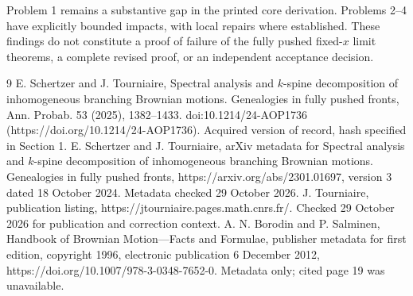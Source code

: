 \documentclass[10pt]{article}
\begin{document}
Problem 1 remains a substantive gap in the printed core derivation. Problems 2–4 have explicitly bounded impacts, with local repairs where established. These findings do not constitute a proof of failure of the fully pushed fixed-\(x\) limit theorems, a complete revised proof, or an independent acceptance decision.\par
9 E. Schertzer and J. Tourniaire, Spectral analysis and \(k\)-spine decomposition of inhomogeneous branching Brownian motions. Genealogies in fully pushed fronts, Ann. Probab. 53 (2025), 1382–1433. doi:10.1214/24-AOP1736 (https://doi.org/10.1214/24-AOP1736). Acquired version of record, hash specified in Section 1. E. Schertzer and J. Tourniaire, arXiv metadata for Spectral analysis and \(k\)-spine decomposition of inhomogeneous branching Brownian motions. Genealogies in fully pushed fronts, https://arxiv.org/abs/2301.01697, version 3 dated 18 October 2024. Metadata checked 29 October 2026. J. Tourniaire, publication listing, https://jtourniaire.pages.math.cnrs.fr/. Checked 29 October 2026 for publication and correction context. A. N. Borodin and P. Salminen, Handbook of Brownian Motion—Facts and Formulae, publisher metadata for first edition, copyright 1996, electronic publication 6 December 2012, https://doi.org/10.1007/978-3-0348-7652-0. Metadata only; cited page 19 was unavailable.\par
\end{document}
